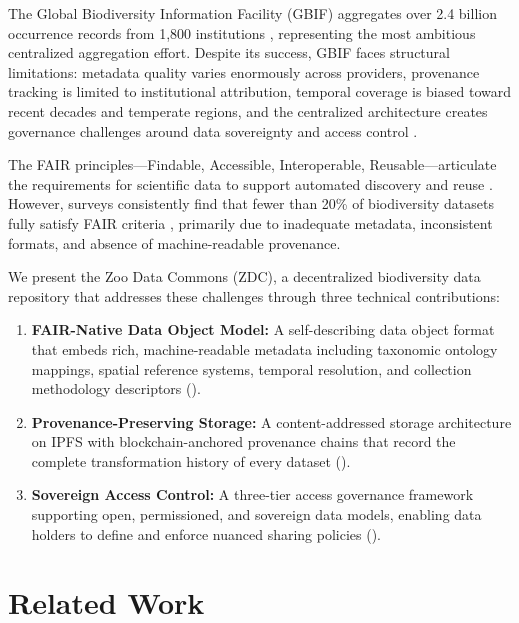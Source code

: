\documentclass[11pt,a4paper]{article}
\begin{document}
The Global Biodiversity Information Facility (GBIF) aggregates over 2.4 billion occurrence records from 1,800 institutions \citep{gbif2024overview}, representing the most ambitious centralized aggregation effort.
Despite its success, GBIF faces structural limitations: metadata quality varies enormously across providers, provenance tracking is limited to institutional attribution, temporal coverage is biased toward recent decades and temperate regions, and the centralized architecture creates governance challenges around data sovereignty and access control \citep{yesson2007how}.

The FAIR principles---Findable, Accessible, Interoperable, Reusable---articulate the requirements for scientific data to support automated discovery and reuse \citep{wilkinson2016fair}.
However, surveys consistently find that fewer than 20\% of biodiversity datasets fully satisfy FAIR criteria \citep{jacobsen2020fair}, primarily due to inadequate metadata, inconsistent formats, and absence of machine-readable provenance.

We present the Zoo Data Commons (ZDC), a decentralized biodiversity data repository that addresses these challenges through three technical contributions:

\begin{enumerate}[leftmargin=*]
    \item \textbf{FAIR-Native Data Object Model:} A self-describing data object format that embeds rich, machine-readable metadata including taxonomic ontology mappings, spatial reference systems, temporal resolution, and collection methodology descriptors ().
    \item \textbf{Provenance-Preserving Storage:} A content-addressed storage architecture on IPFS with blockchain-anchored provenance chains that record the complete transformation history of every dataset ().
    \item \textbf{Sovereign Access Control:} A three-tier access governance framework supporting open, permissioned, and sovereign data models, enabling data holders to define and enforce nuanced sharing policies ().
\end{enumerate}

\section{Related Work}
\label{sec:related}
\end{document}

